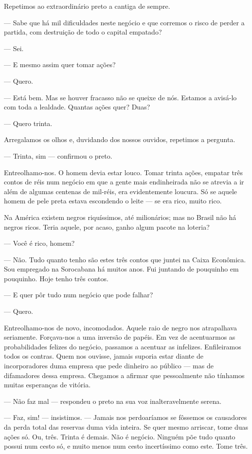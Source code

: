 Repetimos ao extraordinário preto a cantiga de sempre.

--- Sabe que há mil dificuldades neste negócio e que corremos o risco de
perder a partida, com destruição de todo o capital empatado?

--- Sei.

--- E mesmo assim quer tomar ações?

--- Quero.

--- Está bem. Mas se houver fracasso não se queixe de nós. Estamos a
avisá-lo com toda a lealdade. Quantas ações quer? Duas?

--- Quero trinta.

Arregalamos os olhos e, duvidando dos nossos ouvidos, repetimos a
pergunta.

--- Trinta, sim --- confirmou o preto.

Entreolhamo-nos. O homem devia estar louco. Tomar trinta ações, empatar
três contos de réis num negócio em que a gente mais endinheirada não se
atrevia a ir além de algumas centenas de mil-réis, era evidentemente
loucura. Só se aquele homem de pele preta estava escondendo o leite ---
se era rico, muito rico.

Na América existem negros riquíssimos, até milionários; mas no Brasil
não há negros ricos. Teria aquele, por acaso, ganho algum pacote na
loteria?

--- Você é rico, homem?

--- Não. Tudo quanto tenho são estes três contos que juntei na Caixa
Econômica. Sou empregado na Sorocabana há muitos anos. Fui juntando de
pouquinho em pouquinho. Hoje tenho três contos.

--- E quer pôr tudo num negócio que pode falhar?

--- Quero.

Entreolhamo-nos de novo, incomodados. Aquele raio de negro nos
atrapalhava seriamente. Forçava-nos a uma inversão de papéis. Em vez de
acentuarmos as probabilidades felizes do negócio, passamos a acentuar as
infelizes. Enfileiramos todos os contras. Quem nos ouvisse, jamais
suporia estar diante de incorporadores duma empresa que pede dinheiro ao
público --- mas de difamadores dessa empresa. Chegamos a afirmar que
pessoalmente não tínhamos muitas esperanças de vitória.

--- Não faz mal --- respondeu o preto na sua voz inalteravelmente
serena.

--- Faz, sim! --- insistimos. --- Jamais nos perdoaríamos se fôssemos os
causadores da perda total das reservas duma vida inteira. Se quer mesmo
arriscar, tome duas ações só. Ou, três. Trinta é demais. Não é negócio.
Ninguém põe tudo quanto possui num cesto só, e muito menos num cesto
incertíssimo como este. Tome três.

